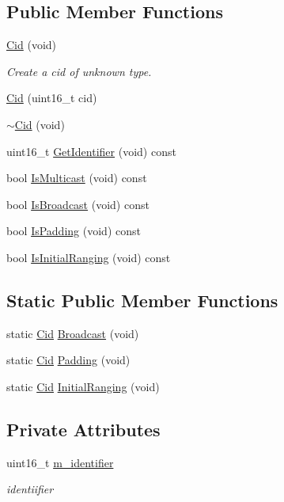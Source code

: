 \subsection*{Public Member Functions}
\begin{DoxyCompactItemize}
\item 
\hyperlink{classns3_1_1Cid_a83b367983cea9d302da91bfa36baaa3c}{Cid} (void)
\begin{DoxyCompactList}\small\item\em Create a cid of unknown type. \end{DoxyCompactList}\item 
\hyperlink{classns3_1_1Cid_ad3871105355980d6d0d398f2717b7910}{Cid} (uint16\+\_\+t cid)
\item 
\hyperlink{classns3_1_1Cid_a29ad2204ebacea07517cfa8e48e6d194}{$\sim$\+Cid} (void)
\item 
uint16\+\_\+t \hyperlink{classns3_1_1Cid_a8745a5cf5b7f2e5d142c4fb79072a053}{Get\+Identifier} (void) const 
\item 
bool \hyperlink{classns3_1_1Cid_a2bd52ee9cef710e97c3e9034b680ac38}{Is\+Multicast} (void) const 
\item 
bool \hyperlink{classns3_1_1Cid_af02254c3891a00a8032359fa14206d55}{Is\+Broadcast} (void) const 
\item 
bool \hyperlink{classns3_1_1Cid_ac029211ea9958cf85f8b83ed17413d4b}{Is\+Padding} (void) const 
\item 
bool \hyperlink{classns3_1_1Cid_a731e5439f22cd7843b9c5958f03ea825}{Is\+Initial\+Ranging} (void) const 
\end{DoxyCompactItemize}
\subsection*{Static Public Member Functions}
\begin{DoxyCompactItemize}
\item 
static \hyperlink{classns3_1_1Cid}{Cid} \hyperlink{classns3_1_1Cid_ad0eba402a114ef864b4109a3b58c0aec}{Broadcast} (void)
\item 
static \hyperlink{classns3_1_1Cid}{Cid} \hyperlink{classns3_1_1Cid_ad04fb2b950d3de75e55111082a72419b}{Padding} (void)
\item 
static \hyperlink{classns3_1_1Cid}{Cid} \hyperlink{classns3_1_1Cid_a5c204ab0df783c7594c764bae1611436}{Initial\+Ranging} (void)
\end{DoxyCompactItemize}
\subsection*{Private Attributes}
\begin{DoxyCompactItemize}
\item 
uint16\+\_\+t \hyperlink{classns3_1_1Cid_af9bfcfd6339671dc3ca1572f3b48dfd0}{m\+\_\+identifier}
\begin{DoxyCompactList}\small\item\em identiifier \end{DoxyCompactList}\end{DoxyCompactItemize}
